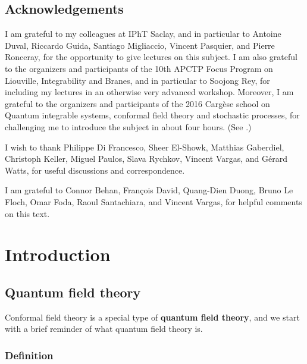 \documentclass[12pt, a4paper, notitlepage, twoside]{report}
\numberwithin{equation}{section}
\theoremstyle{break}
\begin{document}
\section{Acknowledgements}

I am grateful to my colleagues at IPhT Saclay, and in particular to Antoine Duval, Riccardo Guida, Santiago Migliaccio, Vincent Pasquier, and Pierre Ronceray, for the opportunity to give lectures on this subject. I am also grateful to the organizers and participants of the 10th APCTP Focus Program on Liouville, Integrability and Branes, and in particular to Soojong Rey, for including my lectures in an otherwise very advanced workshop. Moreover, I am grateful to the organizers and participants of the 2016 Carg\`ese school on Quantum integrable systems, conformal field theory and stochastic processes, for challenging me to introduce the subject in about four hours. (See \cite{rib16}.) 

I wish to thank Philippe Di Francesco, Sheer El-Showk, Matthias Gaberdiel, Christoph Keller, Miguel Paulos, Slava Rychkov, Vincent Vargas, and G\'erard Watts, for useful discussions and correspondence.

I am grateful to Connor Behan, Fran\c{c}ois David, Quang-Dien Duong, Bruno Le Floch, Omar Foda, Raoul Santachiara, and Vincent Vargas, for helpful comments on this text.

\chapter{Introduction \label{secintr}}

\section{Quantum field theory \label{secqft} }

Conformal field theory is a special type of \textbf{\boldmath quantum field theory}, and we start with a brief reminder of what quantum field theory is.

\subsection{Definition} 
\end{document}
